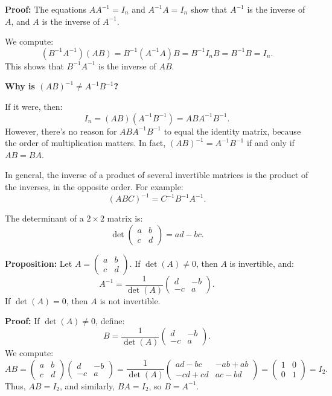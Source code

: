 \documentclass[a4paper,12pt]{article}
\begin{document}
\textbf{Proof:} The equations \( A A^{-1} = I_n \) and \( A^{-1} A = I_n \) show that \( A^{-1} \) is the inverse of \( A \), and \( A \) is the inverse of \( A^{-1} \).

We compute:
\[
(B^{-1} A^{-1}) (AB) = B^{-1} (A^{-1} A) B = B^{-1} I_n B = B^{-1} B = I_n.
\]
This shows that \( B^{-1} A^{-1} \) is the inverse of \( AB \).

\textbf{Why is \( (AB)^{-1} \neq A^{-1} B^{-1} \)?} 

If it were, then:
\[
I_n = (AB)(A^{-1} B^{-1}) = A B A^{-1} B^{-1}.
\]
However, there's no reason for \( A B A^{-1} B^{-1} \) to equal the identity matrix, because the order of multiplication matters. In fact, \( (AB)^{-1} = A^{-1} B^{-1} \) if and only if \( AB = BA \).

In general, the inverse of a product of several invertible matrices is the product of the inverses, in the opposite order. For example:
\[
(ABC)^{-1} = C^{-1} B^{-1} A^{-1}.
\]

\begin{tcolorbox}[title=Definition,colframe=blue!70!black, colback=blue!5!white]
The determinant of a \( 2 \times 2 \) matrix is:
\[
\det\begin{pmatrix} a & b \\ c & d \end{pmatrix} = ad - bc.
\]
\end{tcolorbox}
\textbf{Proposition:} Let \( A = \begin{pmatrix} a & b \\ c & d \end{pmatrix} \). If \( \det(A) \neq 0 \), then \( A \) is invertible, and:
\[
A^{-1} = \frac{1}{\det(A)} \begin{pmatrix} d & -b \\ -c & a \end{pmatrix}.
\]
If \( \det(A) = 0 \), then \( A \) is not invertible.

\textbf{Proof:}
If \( \det(A) \neq 0 \), define:
\[
B = \frac{1}{\det(A)} \begin{pmatrix} d & -b \\ -c & a \end{pmatrix}.
\]
We compute:
\[
AB = \begin{pmatrix} a & b \\ c & d \end{pmatrix} \begin{pmatrix} d & -b \\ -c & a \end{pmatrix} = \frac{1}{\det(A)} \begin{pmatrix} ad - bc & -ab + ab \\ -cd + cd & ac - bd \end{pmatrix} = \begin{pmatrix} 1 & 0 \\ 0 & 1 \end{pmatrix} = I_2.
\]
Thus, \( AB = I_2 \), and similarly, \( BA = I_2 \), so \( B = A^{-1} \).\\
\end{document}

